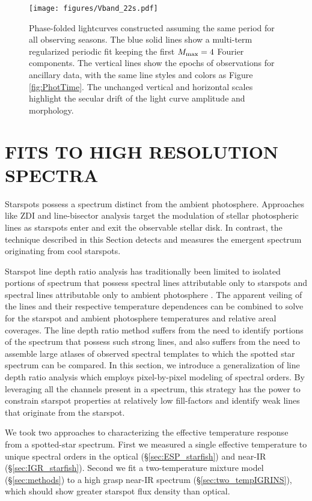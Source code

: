 \documentclass[twocolumn]{emulateapj}%
\begin{document}
\begin{figure*}
 \centering
 \texttt{[image: figures/Vband\_22s.pdf]}
 \caption{Phase-folded lightcurves constructed assuming the same period for all observing seasons.  The blue solid lines show a multi-term regularized periodic fit keeping the first $M_{\rm max}=4$ Fourier components.  The vertical lines show the epochs of observations for ancillary data, with the same line styles and colors as Figure \ref{fig:PhotTime}.  The unchanged vertical and horizontal scales highlight the secular drift of the light curve amplitude and morphology.}
 \label{fig:PhotPhase}
\end{figure*}





\section{FITS TO HIGH RESOLUTION SPECTRA}\label{sec:Starfish}

Starspots possess a spectrum distinct from the ambient photosphere.  Approaches like ZDI and line-bisector analysis \citep[\emph{e.g.}][]{prato08, donati14} target the modulation of stellar photospheric lines as starspots enter and exit the observable stellar disk.  In contrast, the technique described in this Section detects and measures the emergent spectrum originating from cool starspots.

Starspot line depth ratio analysis has traditionally been limited to isolated portions of spectrum that possess spectral lines attributable only to starspots and spectral lines attributable only to ambient photosphere \citep[\emph{e.g.}][]{neff95, oneal01}.  The apparent veiling of the lines and their respective temperature dependences can be combined to solve for the starspot and ambient photosphere temperatures and relative areal coverages.  The line depth ratio method suffers from the need to identify portions of the spectrum that possess such strong lines, and also suffers from the need to assemble large atlases of observed spectral templates to which the spotted star spectrum can be compared.  In this section, we introduce a generalization of line depth ratio analysis which employs pixel-by-pixel modeling of spectral orders.  By leveraging all the channels present in a spectrum, this strategy has the power to constrain starspot properties at relatively low fill-factors and identify weak lines that originate from the starspot.

We took two approaches to characterizing the effective temperature response from a spotted-star spectrum.  First we measured a single effective temperature to unique spectral orders in the optical (\S \ref{sec:ESP_starfish}) and near-IR (\S \ref{sec:IGR_starfish}).  Second we fit a two-temperature mixture model (\S \ref{sec:methods}) to a high grasp near-IR spectrum (\S \ref{sec:two_tempIGRINS}), which should show greater starspot flux density than optical.
\end{document}
